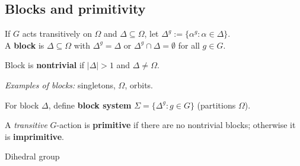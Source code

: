 \subsection{Blocks and primitivity}

\begin{slide}
    \begin{definition}[block]
        \vspace{0pt}
        If $G$ acts transitively on $\Omega$ and $\Delta \subseteq \Omega$, let $\Delta^g := \{\alpha^g : \alpha \in \Delta\}$. \\
        A \textbf{block} is $\Delta \subseteq \Omega$ with $\Delta^g = \Delta$ or $\Delta^g \cap \Delta = \emptyset$ for all $g \in G$.

        Block is \textbf{nontrivial} if $|\Delta| > 1$ and $\Delta \neq \Omega$.
    \end{definition}

    \textit{Examples of blocks:} singletons, $\Omega$, orbits.

    For block $\Delta$, define \textbf{block system} $\Sigma = \{\Delta^g : g \in G\}$ (partitions $\Omega$).

    \begin{definition}[primitivity]
        \vspace{0pt}
        A \textit{transitive} $G$-action is \textbf{primitive} if there are no nontrivial blocks; otherwise it is \textbf{imprimitive}.
    \end{definition}
\end{slide}

\begin{slide}
    Dihedral group
\end{slide}